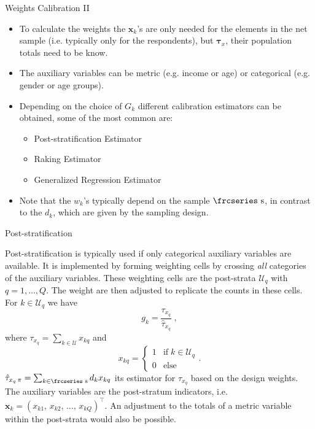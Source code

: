 \documentclass[10pt]{beamer}\usepackage[]{graphicx}\usepackage[]{color}
\newcommand{\textfrc}[1]{{\frcseries#1}}
\newcommand{\mathfrc}[1]{\text{\textfrc{#1}}}
\begin{document}
\begin{frame}{Weights Calibration II}
\begin{itemize}
\item To calculate the weights the $\mathbf{x}_k$'s are only needed for the elements in the net sample (i.e. typically only for the respondents), but $\boldsymbol{\tau}_x$, their population totals need to be know.

\item The auxiliary variables can be metric (e.g. income or age) or categorical (e.g. gender or age groups).

\item Depending on the choice of $G_k$ different calibration estimators can be obtained, some of the most common are: \begin{itemize}
\item Post-stratification Estimator
\item Raking Estimator
\item Generalized Regression Estimator
\end{itemize}
 
\item Note that the $w_k$'s typically depend on the sample $\mathfrc{s}$, in contrast to the $d_k$, which are given by the sampling design.

\end{itemize}
\end{frame}

\begin{frame}{Post-stratification}

Post-stratification is typically used if only categorical auxiliary variables are available. It is implemented by forming weighting cells by crossing \emph{all} categories of the auxiliary variables.
These weighting cells are the post-strata $\mathcal{U}_q$ with $q=1,\ldots,Q$.
The weight are then adjusted to replicate the counts in these cells. For $k \in \mathcal{U}_q$  we have
$$g_k = \dfrac{\tau_{x_q}}{\hat{\tau}_{x_q}}\;{,}$$
 where $\tau_{x_q}= \sum_{k \in \mathcal{U}} x_{kq}$ and 
 $$
x_{kq}=
 \begin{cases}
 1 & \text{if}\; k \in \mathcal{U}_q \\
 0 & \text{else}
 \end{cases}.
 $$
 $\hat{\tau}_{x_q\,\pi}=\sum_{k \in \mathfrc{s}} d_k x_{kq}$ its estimator for $\tau_{x_q}$ based on the design weights. The auxiliary variables are the post-stratum indicators, i.e. $\mathbf{x}_k =(x_{k1}{,}\, x_{k2}{,}\,\ldots{,}\,x_{kQ})^\top$.
 An adjustment to the totals of a metric variable within the post-strata would also be possible.


\end{frame}
\end{document}
